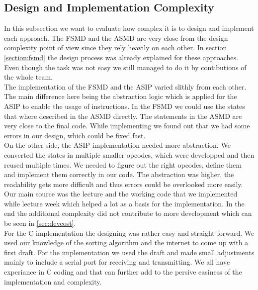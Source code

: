 \documentclass[conference]{IEEEtran}
\begin{document}
\subsection{Design and Implementation Complexity}
In this subsection we want to evaluate how complex it is to design and implement each approach. The FSMD and the ASMD are very close from the design complexity point of view since they rely heavily on each other. In section \autoref{section:fsmd} the design process was already explained for these approaches. Even though the task was not easy we still managed to do it by contibutions of the whole team.\\
The implementation of the FSMD and the ASIP varied slithly from each other. The main difference here being the abstraction logic which is applied for the ASIP to enable the usage of instructions. In the FSMD we could use the states that where described in the ASMD directly. The statements in the ASMD are very close to the final code. While implementing we found out that we had some errors in our design, which could be fixed fast.\\ 
On the other side, the ASIP implementation needed more abstraction. We converted the states in multiple smaller opcodes, which were developped and then reused multiple times. We needed to figure out the right opcodes, define them and implement them correctly in our code. The abstraction was higher, the readability gets more difficult and thus errors could be overlooked more easily. Our main source was the lecture and the working code that we implemented while lecture week which helped a lot as a basis for the implementation. In the end the additional complexity did not contribute to more development which can be seen in \ref*{sec:devcost}.\\
For the C implementation the designing was rather easy and straight forward. We used our knowledge of the sorting algorithm and the internet to come up with a first draft. For the implementation we used the draft and made small adjustments mainly to include a serial port for receiving and transmitting. We all have experiance in C coding and that can further add to the persive easiness of the implementation and complexity. \\
\end{document}
